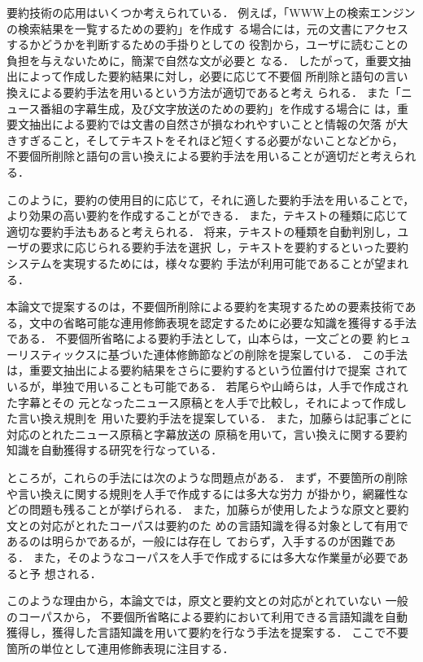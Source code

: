 要約技術の応用はいくつか考えられている．
例えば，「WWW上の検索エンジンの検索結果を一覧するための要約」を作成す
る場合には，元の文書にアクセスするかどうかを判断するための手掛りとしての
役割から，ユーザに読むことの負担を与えないために，簡潔で自然な文が必要と
なる．
したがって，重要文抽出によって作成した要約結果に対し，必要に応じて不要個
所削除と語句の言い換えによる要約手法を用いるという方法が適切であると考え
られる．
また「ニュース番組の字幕生成，及び文字放送のための要約」を作成する場合に
は，重要文抽出による要約では文書の自然さが損なわれやすいことと情報の欠落
が大きすぎること，そしてテキストをそれほど短くする必要がないことなどから，
不要個所削除と語句の言い換えによる要約手法を用いることが適切だと考えられ
る．


このように，要約の使用目的に応じて，それに適した要約手法を用いることで，
より効果の高い要約を作成することができる．
また，テキストの種類に応じて適切な要約手法もあると考えられる．
将来，テキストの種類を自動判別し，ユーザの要求に応じられる要約手法を選択
し，テキストを要約するといった要約システムを実現するためには，様々な要約
手法が利用可能であることが望まれる．

本論文で提案するのは，不要個所削除による要約を実現するための要素技術であ
る，文中の省略可能な連用修飾表現を認定するために必要な知識を獲得する手法である．
不要個所省略による要約手法として，山本ら\cite{yamamoto}は，一文ごとの要
約ヒューリスティックスに基づいた連体修飾節などの削除を提案している．
この手法は，重要文抽出による要約結果をさらに要約するという位置付けで提案
されているが，単独で用いることも可能である．
若尾ら\cite{wakao}や山崎ら\cite{yamasaki}は，人手で作成された字幕とその
元となったニュース原稿とを人手で比較し，それによって作成した言い換え規則を
用いた要約手法を提案している．
また，加藤ら\cite{kato}は記事ごとに対応のとれたニュース原稿と字幕放送の
原稿を用いて，言い換えに関する要約知識を自動獲得する研究を行なっている．

ところが，これらの手法には次のような問題点がある．
まず，不要箇所の削除や言い換えに関する規則を人手で作成するには多大な労力
が掛かり，網羅性などの問題も残ることが挙げられる．
また，加藤らが使用したような原文と要約文との対応がとれたコーパスは要約のた
めの言語知識を得る対象として有用であるのは明らかであるが，一般には存在し
ておらず，入手するのが困難である．
また，そのようなコーパスを人手で作成するには多大な作業量が必要であると予
想される．

このような理由から，本論文では，原文と要約文との対応がとれていない
一般のコーパスから，
不要個所省略による要約において利用できる言語知識を自動獲得し，獲得した言語知識を用いて要約を行なう手法を提案する．
ここで不要箇所の単位として連用修飾表現に注目する．


